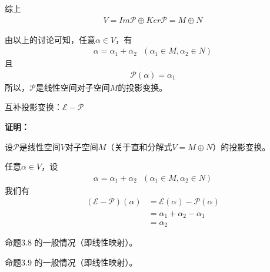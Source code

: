 \documentclass{article}
\begin{document}
\begin{itemize}
        综上
        \begin{align*}
          V = Im\mathscr{P} \oplus Ker\mathscr{P} = M \oplus N
        \end{align*}

        由以上的讨论可知，任意$\alpha \in V$，有
        \begin{align*}
          \alpha = \alpha_1 + \alpha_2 \ \ \ (\alpha_1 \in M, \alpha_2 \in N)
        \end{align*}
        且
        \begin{align*}
          \mathscr{P}( \alpha ) = \alpha_1
        \end{align*}
        所以，$\mathscr{P}$是线性空间对子空间$M$的投影变换。
\end{itemize}

\begin{zremark}
  互补投影变换：$\mathscr{E} - \mathscr{P}$
\end{zremark}

\textbf{证明：}

设$\mathscr{P}$是线性空间$V$对子空间$M$（关于直和分解式$V = M \oplus N$）的投影变换。

任意$\alpha \in V$，设
\begin{align*}
  \alpha = \alpha_1 + \alpha_2 \ \ \ (\alpha_1 \in M, \alpha_2 \in N)
\end{align*}
我们有
\begin{align*}
  (\mathscr{E} - \mathscr{P})(\alpha) 
  & = \mathscr{E}(\alpha) - \mathscr{P}(\alpha) \\
  & = \alpha_1 + \alpha_2 - \alpha_1 \\
  & = \alpha_2
\end{align*}

\begin{zremark}
  命题3.8 的一般情况（即线性映射）。
\end{zremark}

\begin{zremark}
  命题3.9 的一般情况（即线性映射）。
\end{zremark}
\end{document}
